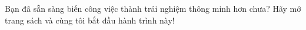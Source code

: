 \documentclass[a4paper,12pt,oneside]{book}
\begin{document}
Bạn đã sẵn sàng biến công việc thành trải nghiệm thông minh hơn chưa? Hãy mở trang sách và cùng tôi bắt đầu hành trình này!





\tableofcontents














% 





% 



% 
\end{document}

